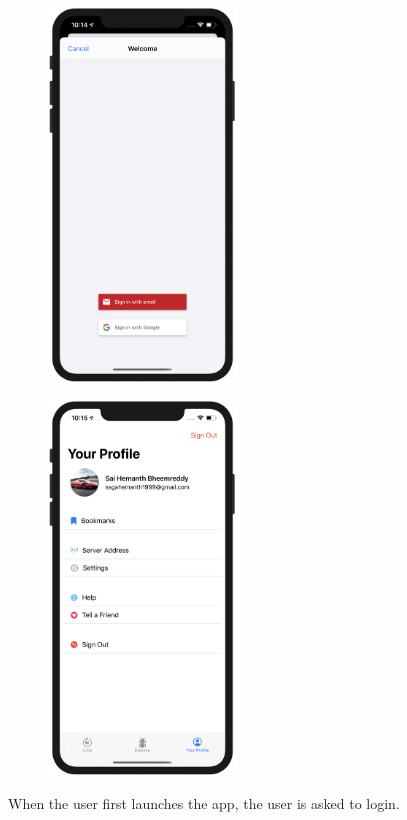 \documentclass[../Report.tex]{subfiles}
\begin{document}
\begin{figure}[H]
    \centering
    \begin{minipage}{.5\textwidth}
      \centering
      \includegraphics[width=5cm]{images/user_login.png}
      \label{fig:ss_user_login}
    \end{minipage}%
    \begin{minipage}{.5\textwidth}
      \centering
      \includegraphics[width=5cm]{images/profile.png}
      \label{fig:ss_user_profile}
    \end{minipage}
\end{figure}

When the user first launches the app, the user is asked to login.
\end{document}

